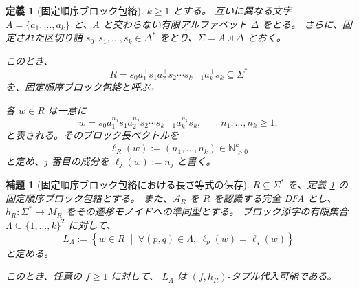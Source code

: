 \documentclass[11pt,a4paper]{ltjsarticle}
\newtheorem{lemma}[theorem]{補題}
\newtheorem{definition}[theorem]{定義}
\theoremstyle{remark}
\begin{document}
\begin{definition}[固定順序ブロック包絡]
\label{def:fixed-ordered-block-envelope}
\(k\ge 1\) とする。
互いに異なる文字 \(A=\{a_1,\ldots,a_k\}\)
と、\(A\) と交わらない有限アルファベット \(\Delta\) をとる。
さらに、固定された区切り語 \(s_0,s_1,\ldots,s_k\in\Delta^*\)
をとり、\(\Sigma=A\uplus\Delta\)
とおく。

このとき、
\[
  R
  =
  s_0a_1^+s_1a_2^+s_2\cdots s_{k-1}a_k^+s_k
  \subseteq\Sigma^*
\]
を、\emph{固定順序ブロック包絡}と呼ぶ。

各 \(w\in R\) は一意に
\[
  w
  =
  s_0a_1^{n_1}s_1a_2^{n_2}s_2
  \cdots
  s_{k-1}a_k^{n_k}s_k,
  \qquad
  n_1,\ldots,n_k\ge1,
\]
と表される。そのブロック長ベクトルを
\[
  \ell_R(w)
  :=
  (n_1,\ldots,n_k)
  \in\mathbb{N}_{>0}^k
\]
と定め、\(j\) 番目の成分を \(\ell_j(w):=n_j\) と書く。
\end{definition}

\begin{lemma}[固定順序ブロック包絡における長さ等式の保存]
\label{lem:block-equality-envelopes}
\(R\subseteq\Sigma^*\) を、定義
\ref{def:fixed-ordered-block-envelope}
の固定順序ブロック包絡とする。
また、\(\mathcal A_R\) を \(R\) を認識する完全 DFA とし、\(h_R:\Sigma^*\longrightarrow M_R\)
をその遷移モノイドへの準同型とする。
ブロック添字の有限集合 \(\Lambda\subseteq\{1,\ldots,k\}^2\)
に対して、
\[
  L_\Lambda
  :=
  \left\{
    w\in R
    \;\middle|\;
    \forall (p,q)\in\Lambda,\ 
    \ell_p(w)=\ell_q(w)
  \right\}
\]
と定める。

このとき、任意の \(f\ge1\) に対して、
\(L_\Lambda\) は \((f,h_R)\)-タプル代入可能である。
\end{lemma}
\end{document}
